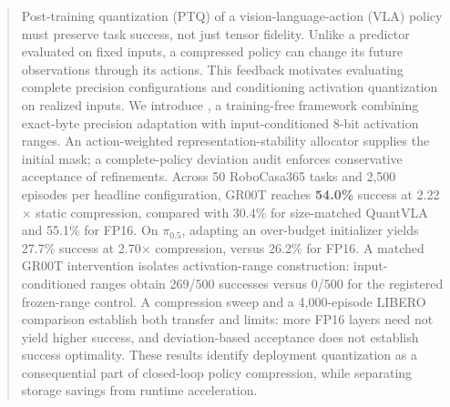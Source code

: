 \begin{abstract}
Post-training quantization (PTQ) of a vision-language-action (VLA) policy must preserve task success, not just tensor fidelity. Unlike a predictor evaluated on fixed inputs, a compressed policy can change its future observations through its actions. This feedback motivates evaluating complete precision configurations and conditioning activation quantization on realized inputs. We introduce \method, a training-free framework combining exact-byte precision adaptation with input-conditioned 8-bit activation ranges. An action-weighted representation-stability allocator supplies the initial mask; a complete-policy deviation audit enforces conservative acceptance of refinements. Across 50 RoboCasa365 tasks and 2,500 episodes per headline configuration, GR00T reaches \textbf{54.0\%} success at 2.22$\times$ static compression, compared with 30.4\% for size-matched QuantVLA and 55.1\% for FP16. On $\pi_{0.5}$, adapting an over-budget initializer yields 27.7\% success at 2.70$\times$ compression, versus 26.2\% for FP16. A matched GR00T intervention isolates activation-range construction: input-conditioned ranges obtain 269/500 successes versus 0/500 for the registered frozen-range control. A compression sweep and a 4,000-episode LIBERO comparison establish both transfer and limits: more FP16 layers need not yield higher success, and deviation-based acceptance does not establish success optimality. These results identify deployment quantization as a consequential part of closed-loop policy compression, while separating storage savings from runtime acceleration.
\end{abstract}